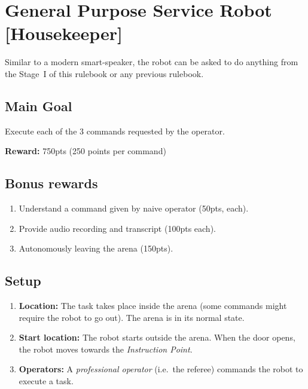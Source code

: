 \section{General Purpose Service Robot [Housekeeper]}
\label{test:gpsr}
Similar to a modern smart-speaker, the robot can be asked to do anything from the Stage~I of this rulebook or any previous rulebook.


\subsection*{Main Goal}
Execute each of the 3 commands requested by the operator.

\noindent\textbf{Reward:} 750pts (250 points per command)\\

\subsection*{Bonus rewards}
\begin{enumerate}[nosep]
	\item Understand a command given by naive operator (50pts, each).
	\item Provide audio recording and transcript (100pts each).
	\item Autonomously leaving the arena (150pts).
\end{enumerate}

%
%
\subsection*{Setup}
\begin{enumerate}[nosep]
	\item \textbf{Location:} The task takes place inside the arena (some commands might require the robot to go out). The arena is in its normal state.

	\item \textbf{Start location:} The robot starts outside the arena. When the door opens, the robot moves towards the \textit{Instruction Point}.

	\item \textbf{Operators:} A \emph{professional operator} (i.e.~the referee) commands the robot to execute a task.
\end{enumerate}


